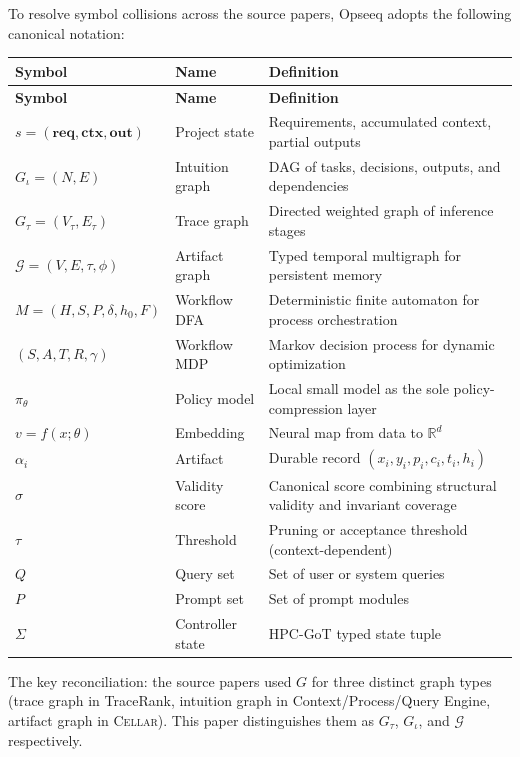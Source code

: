 \documentclass[11pt]{article}
\theoremstyle{remark}
\newcommand{\req}{\mathbf{req}}
\newcommand{\ctx}{\mathbf{ctx}}
\newcommand{\out}{\mathbf{out}}
\newcommand{\graph}{\mathcal{G}}
\newcommand{\cellar}{\textsc{Cellar}}
\begin{document}
To resolve symbol collisions across the source papers, Opseeq adopts the following canonical notation:

\begin{longtable}{p{2.8cm}p{4.2cm}p{7cm}}
\toprule
\textbf{Symbol} & \textbf{Name} & \textbf{Definition} \\
\midrule
\endfirsthead
\toprule
\textbf{Symbol} & \textbf{Name} & \textbf{Definition} \\
\midrule
\endhead
$s = (\req, \ctx, \out)$ & Project state & Requirements, accumulated context, partial outputs \\
$G_\iota = (N, E)$ & Intuition graph & DAG of tasks, decisions, outputs, and dependencies \\
$G_\tau = (V_\tau, E_\tau)$ & Trace graph & Directed weighted graph of inference stages \\
$\graph = (V, E, \tau, \phi)$ & Artifact graph & Typed temporal multigraph for persistent memory \\
$M = (H, S, P, \delta, h_0, F)$ & Workflow DFA & Deterministic finite automaton for process orchestration \\
$(S, A, T, R, \gamma)$ & Workflow MDP & Markov decision process for dynamic optimization \\
$\pi_\theta$ & Policy model & Local small model as the sole policy-compression layer \\
$v = f(x; \theta)$ & Embedding & Neural map from data to $\mathbb{R}^d$ \\
$\alpha_i$ & Artifact & Durable record $(x_i, y_i, p_i, c_i, t_i, h_i)$ \\
$\sigma$ & Validity score & Canonical score combining structural validity and invariant coverage \\
$\tau$ & Threshold & Pruning or acceptance threshold (context-dependent) \\
$Q$ & Query set & Set of user or system queries \\
$P$ & Prompt set & Set of prompt modules \\
$\Sigma$ & Controller state & HPC-GoT typed state tuple \\
\bottomrule
\end{longtable}

The key reconciliation: the source papers used $G$ for three distinct graph types (trace graph in TraceRank, intuition graph in Context/Process/Query Engine, artifact graph in \cellar{}). This paper distinguishes them as $G_\tau$, $G_\iota$, and $\graph$ respectively.
\end{document}
